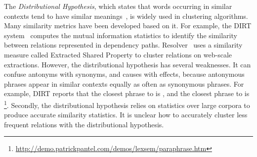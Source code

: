 
The {\em Distributional Hypothesis}, which states that words occurring in similar contexts tend to have similar meanings~\cite{bhagat2013paraphrase}, is widely used in clustering algorithms. Many similarity metrics have been developed based on it. For example, the {\sc DIRT} system~\cite{lin2001discovery} computes the mutual information statistics to identify the similarity between relations represented in dependency paths. {Resolver}~\cite{yates2009unsupervised} uses a similarity measure called Extracted Shared Property to cluster relations on web-scale extractions. However, the distributional hypothesis has several weaknesses. It can confuse antonyms with synonyms, and causes with effects, because antonymous phrases appear in similar contexts equally as often as synonymous phrases. For example, {\sc DIRT} reports that the closest phrase to  is , and the closest phrase to  is  \footnote{\url{http://demo.patrickpantel.com/demos/lexsem/paraphrase.htm}}. Secondly, the distributional hypothesis relies on statistics over large corpora to produce accurate similarity statistics. It is unclear how to accurately cluster less frequent relations with the distributional hypothesis.





